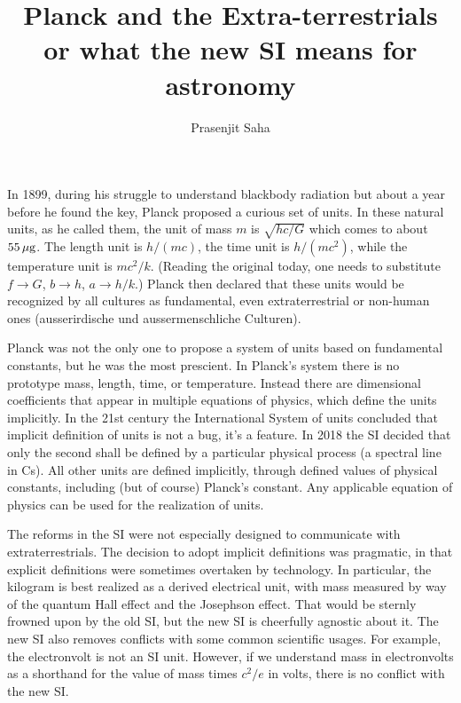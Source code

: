 \documentclass[aps,prb,12pt]{revtex4-1}
\begin{document}
\title{Planck and the Extra-terrestrials\\
       or what the new SI means for astronomy}

\author{Prasenjit Saha} 


\maketitle

In 1899, during his struggle to understand blackbody radiation but
about a year before he found the key, Planck proposed a curious set of
units.\cite{Planck1899} In these natural units, as he called them, the
unit of mass $m$ is $\sqrt{hc/G}$ which comes to about $55\rm\,\mu g$.
The length unit is $h/(mc)$, the time unit is $h/(mc^2)$, while the
temperature unit is $mc^2/k$.  (Reading the original today, one needs
to substitute $f \rightarrow G$, $b\rightarrow h$, $a\rightarrow
h/k$.)  Planck then declared that these units would be recognized by
all cultures as fundamental, even extraterrestrial or non-human ones
(ausserirdische und aussermenschliche Culturen).

Planck was not the only one to propose a system of units based on
fundamental constants,\cite{Tomilin1998} but he was the most
prescient.  In Planck's system there is no prototype mass, length,
time, or temperature.  Instead there are dimensional coefficients that
appear in multiple equations of physics, which define the units
implicitly.  In the 21st century the International System of units
concluded that implicit definition of units is not a bug, it's a
feature.  In 2018 the SI decided that only the second shall be defined
by a particular physical process (a spectral line in Cs).  All other
units are defined implicitly, through defined values of physical
constants, including (but of course) Planck's constant.  Any
applicable equation of physics can be used for the realization of
units.\cite{Jeckelmann_2018}

The reforms in the SI were not especially designed to communicate with
extraterrestrials.  The decision to adopt implicit definitions was
pragmatic, in that explicit definitions were sometimes overtaken by
technology.  In particular, the kilogram is best realized as a derived
electrical unit, with mass measured by way of the quantum Hall effect
and the Josephson effect.  That would be sternly frowned upon by the
old SI, but the new SI is cheerfully agnostic about it.  The new SI
also removes conflicts with some common scientific usages.  For
example, the electronvolt is not an SI unit.  However, if we
understand mass in electronvolts as a shorthand for the value of mass
times $c^2/e$ in volts, there is no conflict with the new SI.
\end{document}
